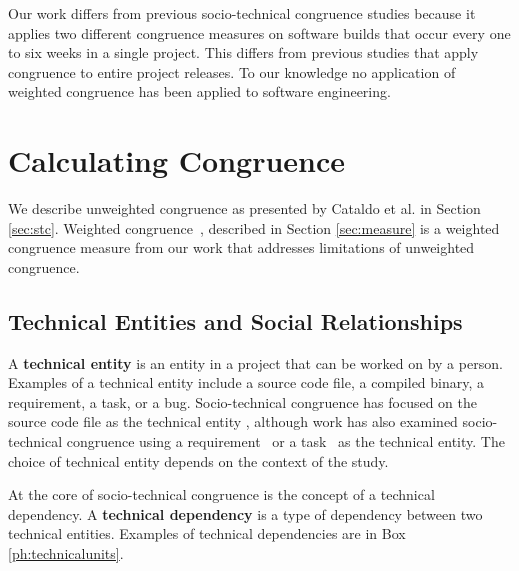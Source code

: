 Our work differs from previous socio-technical congruence studies because it applies two different congruence measures on software builds that occur every one to six weeks in a single project. This differs from previous studies that apply congruence to entire project releases. To our knowledge no application of weighted congruence has been applied to software engineering.




\section{Calculating Congruence}
\label{sec:congruence}

We describe unweighted congruence as presented by Cataldo et al. \cite{cataldo:cscw:2006} in Section \ref{sec:stc}. Weighted congruence~\cite{kwan2009:weighted}, described in Section \ref{sec:measure} is a weighted congruence measure from our work that addresses limitations of unweighted congruence.

\subsection{Technical Entities and Social Relationships}

A \textbf{technical entity} is an entity in a project that can be worked on by a person. Examples of a technical entity include a source code file, a compiled binary, a requirement, a task, or a bug. Socio-technical congruence has focused on the source code file as the technical entity \cite{cataldo:cscw:2006, ehrlich2008:gaps}, although work has also examined socio-technical congruence using a requirement~\cite{damian2010:rdc,marczak2009:crossfunctional} or a task~\cite{wolf:ieee:2009} as the technical entity. The choice of technical entity depends on the context of the study.

At the core of socio-technical congruence is the concept of a technical dependency. A \textbf{technical dependency} is a type of dependency between two technical entities. Examples of technical dependencies are in Box \ref{ph:technicalunits}.

